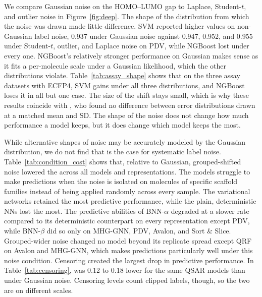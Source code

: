 We compare Gaussian noise on the HOMO--LUMO gap to Laplace, Student-$t$, and outlier noise in Figure~\ref{fig:deep}. The shape of the distribution from which the noise was drawn made little difference. SVM reported higher \aucnorm{} values on non-Gaussian label noise, 0.937 under Gaussian noise against 0.947, 0.952, and 0.955 under Student-$t$, outlier, and Laplace noise on PDV, while NGBoost lost \aucnorm{} under every one. NGBoost's relatively stronger performance on Gaussian makes sense as it fits a per-molecule scale under a Gaussian likelihood, which the other distributions violate. Table~\ref{tab:assay_shape} shows that on the three assay datasets with ECFP4, SVM gains \aucnorm{} under all three distributions, and NGBoost loses it in all but one case. The size of the shift stays small, which is why these results coincide with \citet{Heid2023}, who found no difference between error distributions drawn at a matched mean and SD. The shape of the noise does not change how much performance a model keeps, but it does change which model keeps the most.

While alternative shapes of noise may be accurately modeled by the Gaussian distribution, we do not find that is the case for systematic label noise. Table~\ref{tab:condition_cost} shows that, relative to Gaussian, grouped-shifted noise lowered the \aucnorm{} across all models and representations. The models struggle to make predictions when the noise is isolated on molecules of specific scaffold families instead of being applied randomly across every sample. The variational networks retained the most predictive performance, while the plain, deterministic NNs lost the most. The predictive abilities of BNN-$\alpha$ degraded at a slower rate compared to its deterministic counterpart on every representation except PDV, while BNN-$\beta$ did so only on MHG-GNN, PDV, Avalon, and Sort \& Slice. Grouped-wider noise changed no model beyond its replicate spread except QRF on Avalon and MHG-GNN, which makes predictions particularly well under this noise condition. Censoring created the largest drop in predictive performance. In Table~\ref{tab:censoring}, \aucnorm{} was 0.12 to 0.18 lower for the same QSAR models than under Gaussian noise. Censoring levels count clipped labels, though, so the two are on different scales.

